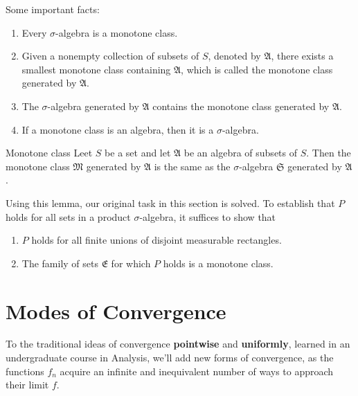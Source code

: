 Some important facts:
\begin{enumerate}
	\item Every $\sigma$-algebra is a monotone class.
	\item Given a nonempty collection of subsets of $S$, denoted by $\mathfrak{A}$, there exists a smallest monotone class containing $\mathfrak{A}$, which is called the monotone class generated by $\mathfrak{A}$.
	\item The $\sigma$-algebra generated by $\mathfrak{A}$ contains the monotone class generated by $\mathfrak{A}$.
	\item If a monotone class is an algebra, then it is a $\sigma$-algebra.
\end{enumerate}

\begin{lemma}[]{Monotone class}{}
	Leet $S$ be a set and let $\mathfrak{A}$ be an algebra of subsets of $S$. Then the monotone class $\mathfrak{M}$ generated by $\mathfrak{A}$ is the same as the $\sigma$-algebra $\mathfrak{S}$ generated by $\mathfrak{A}$.
\end{lemma}

Using this lemma, our original task in this section is solved. To establish that $P$ holds for all sets in a product $\sigma$-algebra, it suffices to show that 
\begin{enumerate}
	\item $P$ holds for all finite unions of disjoint measurable rectangles.
	\item The family of sets $\mathfrak{E}$ for which $P$ holds is a monotone class.
\end{enumerate}

\section{Modes of Convergence}

To the traditional ideas of convergence \textbf{pointwise} and \textbf{uniformly}, learned in an undergraduate course in Analysis, we'll add new forms of convergence, as the functions $f_n$ acquire an infinite and inequivalent number of ways to approach their limit $f$. 

